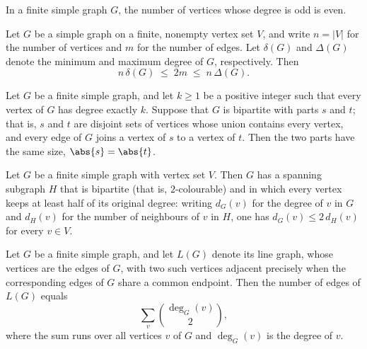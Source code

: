 \begin{theorem}
\label{SimpleGraph.even_card_odd_degree}
\leanok
In a finite simple graph $G$, the number of vertices whose degree is odd is even.
\end{theorem}

\begin{theorem}
\label{SimpleGraph.degree_bounds}
\leanok
Let $G$ be a simple graph on a finite, nonempty vertex set $V$, and write $n = |V|$ for
the number of vertices and $m$ for the number of edges. Let $\delta(G)$ and $\Delta(G)$
denote the minimum and maximum degree of $G$, respectively. Then
\[
n\,\delta(G) \;\le\; 2m \;\le\; n\,\Delta(G).
\]
\end{theorem}

\begin{theorem}
\label{SimpleGraph.regular_bipartite_card_eq}
\leanok
Let $G$ be a finite simple graph, and let $k \ge 1$ be a positive integer such that
every vertex of $G$ has degree exactly $k$. Suppose that $G$ is bipartite with parts $s$
and $t$; that is, $s$ and $t$ are disjoint sets of vertices whose union contains every
vertex, and every edge of $G$ joins a vertex of $s$ to a vertex of $t$. Then the two
parts have the same size, $\abs{s} = \abs{t}$.
\end{theorem}

\begin{theorem}
\label{SimpleGraph.exists_bipartite_spanning_subgraph}
\leanok
Let $G$ be a finite simple graph with vertex set $V$. Then $G$ has a spanning subgraph
$H$ that is bipartite (that is, $2$-colourable) and in which every vertex keeps at least
half of its original degree: writing $d_G(v)$ for the degree of $v$ in $G$ and $d_H(v)$
for the number of neighbours of $v$ in $H$, one has $d_G(v) \le 2\,d_H(v)$ for every $v
\in V$.
\end{theorem}

\begin{theorem}
\label{SimpleGraph.lineGraph_edgeCard}
\leanok
Let $G$ be a finite simple graph, and let $L(G)$ denote its line graph, whose vertices
are the edges of $G$, with two such vertices adjacent precisely when the corresponding
edges of $G$ share a common endpoint. Then the number of edges of $L(G)$ equals
\[
\sum_{v} \binom{\deg_G(v)}{2},
\]
where the sum runs over all vertices $v$ of $G$ and $\deg_G(v)$ is the degree of $v$.
\end{theorem}

